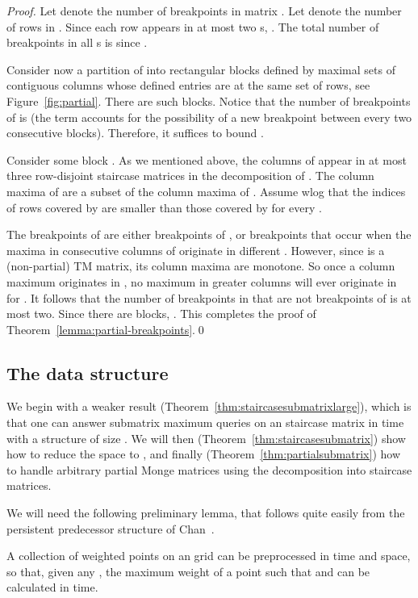 \documentclass{llncs}
\begin{document}
\begin{proof}
Let  denote the number of breakpoints in matrix . 
Let  denote the number of rows in .
Since each row appears in at most two s, .
The total number of breakpoints in all  s is
 since 
.

Consider now a partition of  into rectangular blocks  defined by maximal
sets of contiguous columns whose defined entries are at the same set
of rows, see Figure~\ref{fig:partial}. There are  such blocks.
Notice that the number of breakpoints of  is  (the
 term accounts for the possibility of a new breakpoint between every two
consecutive blocks). Therefore, it suffices to bound .

Consider some block . As we mentioned above, the columns of 
appear in at most three row-disjoint staircase matrices  in the decomposition of
. The column maxima of  are a subset of the column maxima of
. Assume wlog that the indices of rows covered by  are smaller than
those covered by  for every . 

The breakpoints of 
are either breakpoints of , or
breakpoints that occur when the maxima in consecutive columns of 
originate in different . However, since  is a (non-partial)  TM matrix, its column maxima are
monotone. So once a column maximum originates in , no maximum in
greater columns will ever originate in  for . It follows
that the number of breakpoints in  that are not breakpoints of
 is at most two. Since there are   blocks, 
. This completes the proof of Theorem~\ref{lemma:partial-breakpoints}.\qed \end{proof}

\subsection{The data structure}  



We begin with a weaker result (Theorem~\ref{thm:staircasesubmatrixlarge}), which is that one can answer submatrix maximum queries on  an  staircase matrix in  time
with a structure of size . We will then (Theorem~\ref{thm:staircasesubmatrix}) show how to reduce the space to ,  and finally (Theorem~\ref{thm:partialsubmatrix}) how to handle arbitrary partial Monge matrices using the decomposition into staircase matrices. 


We will need the following preliminary lemma, that follows quite easily from the persistent predecessor structure of Chan~\cite{ChanPersistent}. 

\begin{lemma}
\label{lem:dominancemaximum}
A collection  of  weighted points on an  grid can be preprocessed in  time and  space,
so that, given any , the maximum weight of a point  such that  and  can be calculated in
 time.
\end{lemma}
\end{document}
